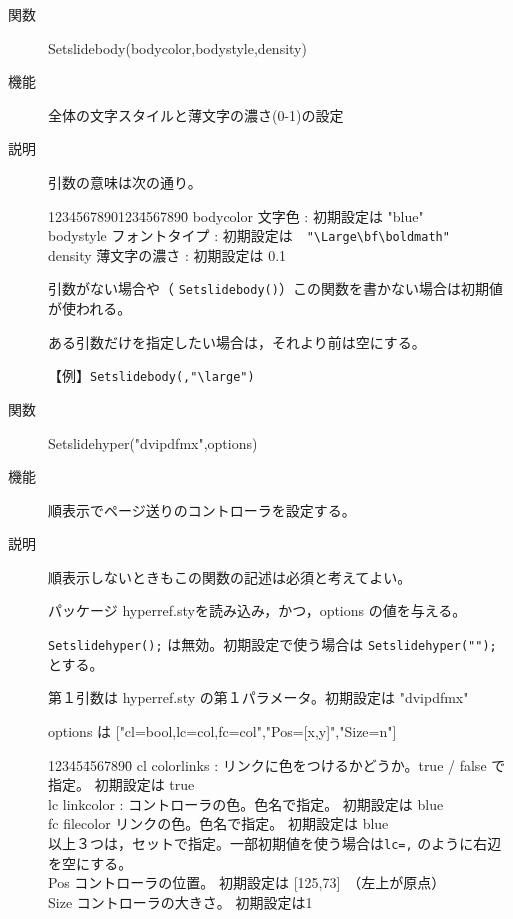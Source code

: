 \documentclass[papersize,a4paper,12pt,uplatex]{jsarticle}
\begin{document}
\begin{description}

\hypertarget{setslidebody}{}
\item[関数]  Setslidebody(bodycolor,bodystyle,density)
\item[機能]  全体の文字スタイルと薄文字の濃さ(0-1)の設定
\item[説明]  引数の意味は次の通り。
\begin{tabbing}
1234567890123\=4567890\=\kill
bodycolor  \> 文字色 :  初期設定は "blue"\\
bodystyle  \> フォントタイプ :  初期設定は　\verb|"\Large\bf\boldmath"|\\
density  \> 薄文字の濃さ :  初期設定は 0.1
\end{tabbing}

引数がない場合や（ \verb|Setslidebody()|）この関数を書かない場合は初期値が使われる。

ある引数だけを指定したい場合は，それより前は空にする。

【例】\verb|Setslidebody(,"\large")|

\vspace{\baselineskip}
\hypertarget{setslidehyper}{}
\item[関数]  Setslidehyper("dvipdfmx",options)
\item[機能]  順表示でページ送りのコントローラを設定する。
\item[説明]  順表示しないときもこの関数の記述は必須と考えてよい。

パッケージ hyperref.styを読み込み，かつ，options の値を与える。

\verb|Setslidehyper();| は無効。初期設定で使う場合は \verb|Setslidehyper("");| とする。

第１引数は hyperref.sty の第１パラメータ。初期設定は "dvipdfmx"

options は ["cl=bool,lc=col,fc=col","Pos=[x,y]","Size=n"]

\begin{tabbing}
12345\=4567890\=\kill
cl \> colorlinks : リンクに色をつけるかどうか。true / false で指定。 初期設定は true\\
lc \> linkcolor : コントローラの色。色名で指定。 初期設定は blue\\
fc\> filecolor リンクの色。色名で指定。 初期設定は blue\\
以上３つは，セットで指定。一部初期値を使う場合は\verb|lc=,| のように右辺を空にする。\\
Pos \> コントローラの位置。 初期設定は [125,73]　（左上が原点）\\
Size \> コントローラの大きさ。 初期設定は1
\end{tabbing}



\end{description}
\end{document}
